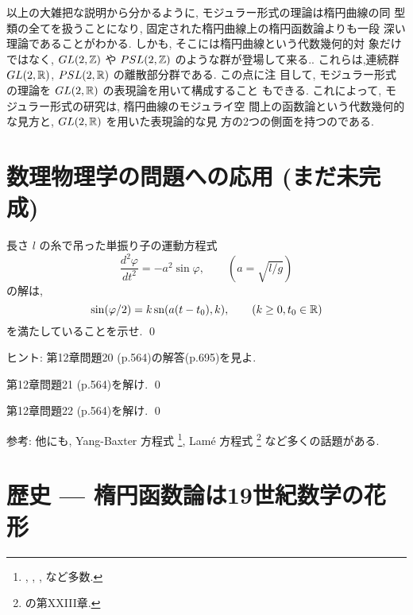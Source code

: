 \documentclass[12pt,twoside]{jarticle}
\def\sn{\mathop{\text{\rm sn}}\nolimits}
\def\Z{{\Bbb Z}} %
\def\R{{\Bbb R}} %
\def\od#1#2{\frac{d #1}{d #2}}
\begin{document}
以上の大雑把な説明から分かるように, モジュラー形式の理論は楕円曲線の同
型類の全てを扱うことになり, 固定された楕円曲線上の楕円函数論よりも一段
深い理論であることがわかる. しかも, そこには楕円曲線という代数幾何的対
象だけではなく, $GL(2,\Z)$ や $PSL(2,\Z)$ のような群が登場して来る.. 
これらは,連続群 $GL(2,\R)$, $PSL(2,\R)$ の離散部分群である. この点に注
目して, モジュラー形式の理論を $GL(2,\R)$ の表現論を用いて構成すること
もできる. これによって, モジュラー形式の研究は, 楕円曲線のモジュライ空
間上の函数論という代数幾何的な見方と, $GL(2,\R)$ を用いた表現論的な見
方の2つの側面を持つのである.


\section{数理物理学の問題への応用 (まだ未完成)}

\begin{question}[単振り子]
  長さ $l$ の糸で吊った単振り子の運動方程式
  \[
    \od{^2\varphi}{t^2} = - a^2 \sin \varphi,
    \qquad \left(a=\sqrt{l/g}\right)
  \] %
  の解は,
  \[
  \textstyle
    \sin(\varphi/2) = k \sn(a(t - t_0), k),
    \qquad
    (k\ge 0, t_0\in\R)
  \]
  を満たしていることを示せ. \qed
\end{question}

\noindent ヒント: \cite{Terakan} 第12章問題20 (p.564)の解答(p.695)を見よ.

\begin{question}[剛体の回転運動]
  \cite{Terakan} 第12章問題21 (p.564)を解け. \qed
\end{question}

\begin{question}[独楽の回転運動]
  \cite{Terakan} 第12章問題22 (p.564)を解け. \qed
\end{question}

\noindent 参考: 他にも, %
Yang-Baxter 方程式%
\footnote{\cite{Baxter}, \cite{Belavin}, \cite{BD}, \cite{JKMO}など多数.}, %
Lam\'e 方程式%
\footnote{\cite{WW}の第XXIII章.} %
など多くの話題がある.


\section{歴史 --- 楕円函数論は19世紀数学の花形}
\end{document}
